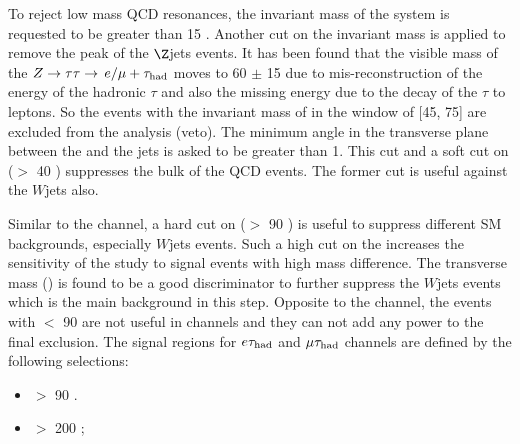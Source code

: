 To reject low mass QCD resonances, the invariant mass of the \leptonTau system  is requested to be greater than 15 \GeV. 
Another cut on the invariant mass is applied to remove the peak of the $\Z$jets events. 
It has been found that the visible mass of the $Z\to\tau\tau\to\,e/\mu +\tau_{\rm had}$ moves to 60 $\pm$ 15 \GeV due to 
mis-reconstruction of the energy of the hadronic $\tau$ and also the missing energy due to the decay of the $\tau$ to leptons. 
So the events with the invariant mass of \leptonTau in the window of [45, 75] are excluded from the analysis (\Z veto). 
The minimum angle in the transverse plane between the \MET and the jets %
is asked to be greater than 1. This cut and a soft cut on \mttwo ($>$ 40 \GeV) suppresses the bulk of the QCD events. The former cut is useful 
against the $W$jets also.

Similar to the \tauTau channel, a hard cut on \mttwo ($>$ 90 \GeV) is useful to suppress different SM backgrounds, especially $W$jets events.
Such a high cut on the \mttwo increases the sensitivity of the study to signal events with high mass difference. The \Tau transverse mass (\tauMT)
is found to be a good discriminator to further suppress the $W$jets events which is the main background in this step. 
Opposite to the \tauTau channel, the events with \mttwo $<$ 90 \GeV are not useful in \leptonTau channels and they can not add any power to 
the final exclusion. The signal regions for $e\tau_{\rm had}$ and $\mu\tau_{\rm had}$ channels are defined by the following selections:
\begin{itemize}
\item \mttwo $>$ 90 \GeV.
\item \tauMT $>$ 200 \GeV; 
\end{itemize}


